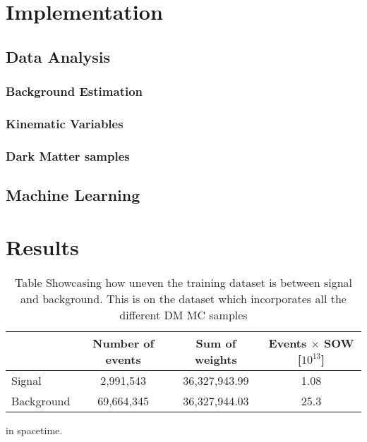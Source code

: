 \documentclass[14pt, a4paper]{book}
\begin{document}
\part{Implementation}
\chapter{Data Analysis}
\section{Background Estimation}
\section{Kinematic Variables}
\section{Dark Matter samples}

\chapter{Machine Learning}


\part{Results}

\begin{table}[!h]
    \centering
    \begin{tabular}{l|c|c|c}\midrule\midrule
                    & Number of events & Sum of weights & Events $\times$ SOW [$10^{13}$]\\\midrule
         Signal     & 2,991,543        & 36,327,943.99  & 1.08\\
         Background & 69,664,345       & 36,327,944.03  & 25.3 \\ \midrule\midrule
    \end{tabular}
    \caption[Unbalanced DM training dataset]{Table Showcasing how uneven the training dataset is between signal and background. This is on the dataset which incorporates all the different DM MC samples}
    \label{tab:UnbalancedDMTraining}
\end{table}
in spacetime.

\end{document}
